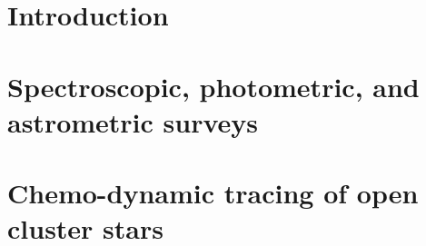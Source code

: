 





\pagestyle{fancy}
\fancyhead[CE,RE]{}
\fancyhead[LO,CO]{}
\fancyhead[LE]{\textbf{\nouppercase{\leftmark}}}
\fancyhead[RO]{\textbf{\nouppercase{\rightmark}}}


\chapter{Introduction}
\label{chap:intro}


\chapter{Spectroscopic, photometric, and astrometric surveys}
\label{chap:surveys}


\chapter{Chemo-dynamic tracing of open cluster stars}
\label{chap:clusters}


